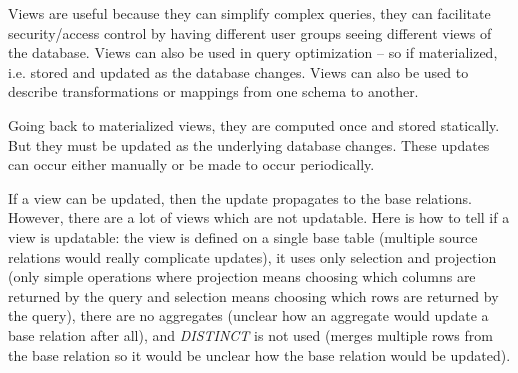 \documentclass{article}
\begin{document}
Views are useful because they can simplify complex queries, they can facilitate security/access control by having different user groups seeing different views of the database. Views can also be used in query optimization -- so if materialized, i.e. stored and updated as the database changes. Views can also be used to describe transformations or mappings from one schema to another.

Going back to materialized views, they are computed once and stored statically. But they must be updated as the underlying database changes. These updates can occur either manually or be made to occur periodically.

If a view can be updated, then the update propagates to the base relations. However, there are a lot of views which are not updatable. Here is how to tell if a view is updatable: the view is defined on a single base table (multiple source relations would really complicate updates), it uses only selection and projection (only simple operations where projection means choosing which columns are returned by the query and selection means choosing which rows are returned by the query), there are no aggregates (unclear how an aggregate would update a base relation after all), and \textit{DISTINCT} is not used (merges multiple rows from the base relation so it would be unclear how the base relation would be updated).
\end{document}

